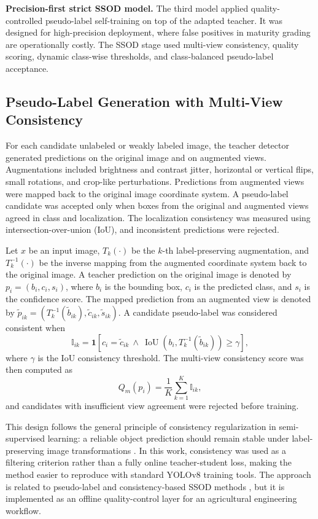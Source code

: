 ﻿\documentclass[12pt]{article}
\begin{document}
\textbf{Precision-first strict SSOD model.} The third model applied quality-controlled pseudo-label self-training on top of the adapted teacher. It was designed for high-precision deployment, where false positives in maturity grading are operationally costly. The SSOD stage used multi-view consistency, quality scoring, dynamic class-wise thresholds, and class-balanced pseudo-label acceptance.

\subsection{Pseudo-Label Generation with Multi-View Consistency}

For each candidate unlabeled or weakly labeled image, the teacher detector generated predictions on the original image and on augmented views. Augmentations included brightness and contrast jitter, horizontal or vertical flips, small rotations, and crop-like perturbations. Predictions from augmented views were mapped back to the original image coordinate system. A pseudo-label candidate was accepted only when boxes from the original and augmented views agreed in class and localization. The localization consistency was measured using intersection-over-union (IoU), and inconsistent predictions were rejected.

Let \(x\) be an input image, \(T_k(\cdot)\) be the \(k\)-th label-preserving augmentation, and \(T_k^{-1}(\cdot)\) be the inverse mapping from the augmented coordinate system back to the original image. A teacher prediction on the original image is denoted by \(p_i=(b_i,c_i,s_i)\), where \(b_i\) is the bounding box, \(c_i\) is the predicted class, and \(s_i\) is the confidence score. The mapped prediction from an augmented view is denoted by \(\tilde{p}_{ik}=(T_k^{-1}(\tilde{b}_{ik}),\tilde{c}_{ik},\tilde{s}_{ik})\). A candidate pseudo-label was considered consistent when
\[
\mathbb{I}_{ik} =
\mathbf{1}\left[
c_i=\tilde{c}_{ik}
\ \land\
\operatorname{IoU}\left(b_i,T_k^{-1}(\tilde{b}_{ik})\right)\ge \gamma
\right],
\]
where \(\gamma\) is the IoU consistency threshold. The multi-view consistency score was then computed as
\[
Q_m(p_i)=\frac{1}{K}\sum_{k=1}^{K}\mathbb{I}_{ik},
\]
and candidates with insufficient view agreement were rejected before training.

This design follows the general principle of consistency regularization in semi-supervised learning: a reliable object prediction should remain stable under label-preserving image transformations \citep{tarvainen2017mean,sohn2020fixmatch}. In this work, consistency was used as a filtering criterion rather than a fully online teacher-student loss, making the method easier to reproduce with standard YOLOv8 training tools. The approach is related to pseudo-label and consistency-based SSOD methods \citep{sohn2020stac,liu2021unbiased,xu2021softteacher,li2022pseco}, but it is implemented as an offline quality-control layer for an agricultural engineering workflow.
\end{document}
